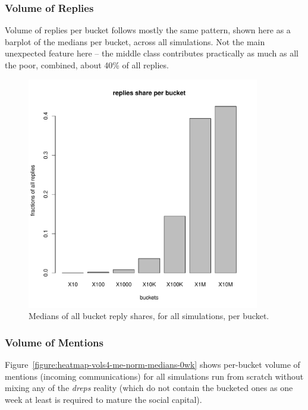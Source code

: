 \documentclass[10pt,oneside]{memoir}
\begin{document}
\begin{Spacing}{2}
\subsubsection{Volume of Replies}
\label{volumeofreplies}

Volume of replies per bucket follows mostly the same pattern, shown here as a barplot of the medians per bucket, across all simulations.   Not the main unexpected feature here -- the middle class contributes practically as much as all the poor, combined, about 40\% of all replies.



\begin{figure}
\begin{center}
    \includegraphics[width=4in]{figures/vols4-re-norm-medians-med}
    \caption{Medians of all bucket reply shares, for all simulations, per bucket.}
    \label{figure:vols4-re-norm-medians-med}
\end{center}
\end{figure}
\pagebreak \subsubsection{Volume of Mentions}
\label{volumeofmentions}

Figure~\ref{figure:heatmap-vols4-me-norm-medians-0wk} shows per-bucket volume of mentions (incoming communications) for all simulations  run from scratch without mixing any of the {\itshape dreps} reality (which do not contain the bucketed ones as one week at least is required to mature the social capital).



\end{Spacing}
\end{document}
